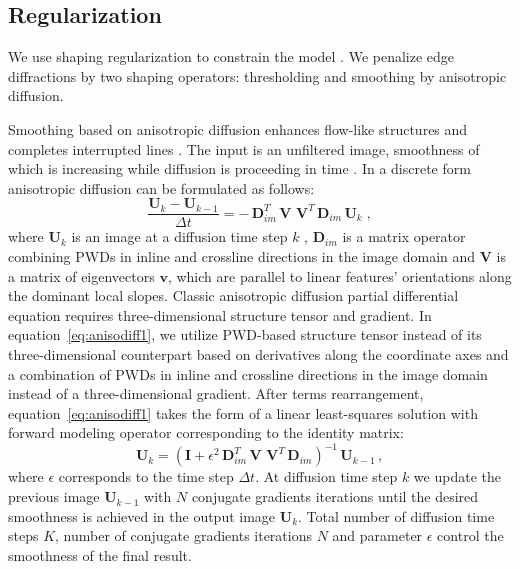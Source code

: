 \subsection{Regularization}

We use shaping regularization to constrain the model \cite[]{fomel2007shaping}. We penalize
edge diffractions by two shaping operators: thresholding and smoothing by anisotropic diffusion.

Smoothing based on anisotropic diffusion enhances flow-like structures and
completes interrupted lines \cite[]{weickert1998anisotropic}. The input is an unfiltered
image, smoothness of which is increasing while diffusion is proceeding in time \cite[]{fehmers2003fast}. In a discrete
form anisotropic diffusion can be formulated as follows:
\begin{equation}
\label{eq:anisodiff1}
\frac{\mathbf{U}_k-\mathbf{U}_{k-1}}{\Delta t} = - \,\mathbf{D}^T_{im}\,\mathbf{V}\,\,\mathbf{V}^T\,\mathbf{D}_{im}\,\mathbf{U}_k\;,
\end{equation}
where $\mathbf{U}_k$ is an image at a diffusion time step $k$ , $\mathbf{D}_{im}$ is a matrix operator combining PWDs in inline and crossline
directions in the image domain and $\mathbf{V}$ is a matrix of eigenvectors $\mathbf{v}$, which are parallel
to linear features' orientations along the dominant local slopes. Classic anisotropic diffusion partial differential equation \cite[]{weickert1998anisotropic} requires
three-dimensional structure tensor and gradient. In equation~\ref{eq:anisodiff1}, we utilize PWD-based structure tensor instead of its
three-dimensional counterpart based on derivatives along the coordinate axes and a combination of PWDs in inline and
crossline directions in the image domain instead of a three-dimensional gradient.
After terms rearrangement, equation~\ref{eq:anisodiff1} takes the form of a linear least-squares solution
with forward modeling operator corresponding to the identity matrix:
\begin{equation}
\label{eq:diffuse}
\mathbf{U}_k = \left(\mathbf{I} + \epsilon^2\,\mathbf{D}^T_{im}\,\mathbf{V}\,\,\mathbf{V}^T\,\mathbf{D}_{im}\right)^{-1}\,\mathbf{U}_{k-1}\, ,
\end{equation}
where $\epsilon$ corresponds to the time step $\Delta t$. At diffusion time step $k$ we update the previous image $\mathbf{U}_{k-1}$ with $N$ conjugate gradients iterations
until the desired smoothness is achieved in the output image $\mathbf{U}_{k}$.
Total number of diffusion time steps $K$, number of conjugate gradients iterations $N$ and parameter $\epsilon$ control the smoothness of the final result.

